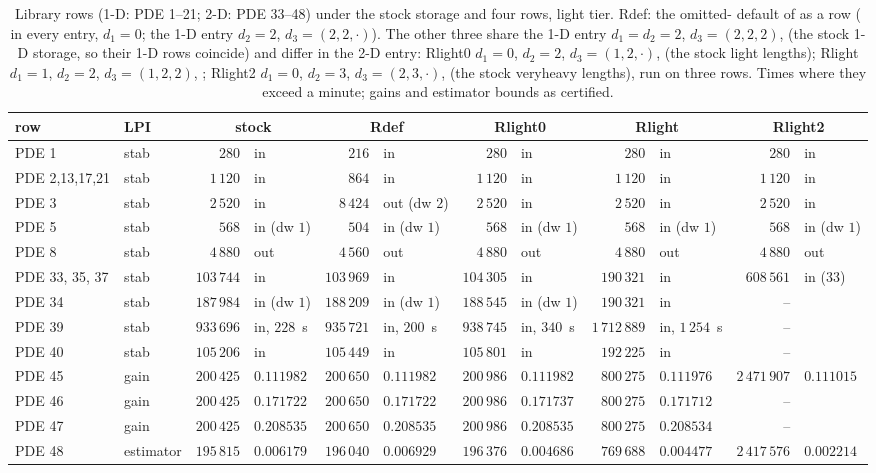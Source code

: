 \begin{table}[h]\centering\scriptsize
\setlength{\tabcolsep}{1.8pt}
\begin{tabular}{llrlrlrlrlrl}
\toprule
row & LPI & \multicolumn{2}{c}{stock} & \multicolumn{2}{c}{Rdef} & \multicolumn{2}{c}{Rlight0} & \multicolumn{2}{c}{Rlight} & \multicolumn{2}{c}{Rlight2} \\
\midrule
PDE 1 & stab & $280$ & in & $216$ & in & $280$ & in & $280$ & in & $280$ & in \\
PDE 2,13,17,21 & stab & $1\,120$ & in & $864$ & in & $1\,120$ & in & $1\,120$ & in & $1\,120$ & in \\
PDE 3 & stab & $2\,520$ & in & $8\,424$ & out (dw $2$) & $2\,520$ & in & $2\,520$ & in & $2\,520$ & in \\
PDE 5 & stab & $568$ & in (dw $1$) & $504$ & in (dw $1$) & $568$ & in (dw $1$) & $568$ & in (dw $1$) & $568$ & in (dw $1$) \\
PDE 8 & stab & $4\,880$ & out & $4\,560$ & out & $4\,880$ & out & $4\,880$ & out & $4\,880$ & out \\
PDE 33, 35, 37 & stab & $103\,744$ & in & $103\,969$ & in & $104\,305$ & in & $190\,321$ & in & $608\,561$ & in (33) \\
PDE 34 & stab & $187\,984$ & in (dw $1$) & $188\,209$ & in (dw $1$) & $188\,545$ & in (dw $1$) & $190\,321$ & in & -- & \\
PDE 39 & stab & $933\,696$ & in, $228$~s & $935\,721$ & in, $200$~s & $938\,745$ & in, $340$~s & $1\,712\,889$ & in, $1\,254$~s & -- & \\
PDE 40 & stab & $105\,206$ & in & $105\,449$ & in & $105\,801$ & in & $192\,225$ & in & -- & \\
PDE 45 & gain & $200\,425$ & $0.111982$ & $200\,650$ & $0.111982$ & $200\,986$ & $0.111982$ & $800\,275$ & $0.111976$ & $2\,471\,907$ & $0.111015$ \\
PDE 46 & gain & $200\,425$ & $0.171722$ & $200\,650$ & $0.171722$ & $200\,986$ & $0.171737$ & $800\,275$ & $0.171712$ & -- & \\
PDE 47 & gain & $200\,425$ & $0.208535$ & $200\,650$ & $0.208535$ & $200\,986$ & $0.208535$ & $800\,275$ & $0.208534$ & -- & \\
PDE 48 & estimator & $195\,815$ & $0.006179$ & $196\,040$ & $0.006929$ & $196\,376$ & $0.004686$ & $769\,688$ & $0.004477$ & $2\,417\,576$ & $0.002214$ \\
\bottomrule
\end{tabular}
\caption{Library rows (1-D: PDE 1--21; 2-D: PDE 33--48) under the stock storage and four rows, light tier. Rdef: the omitted- default of  as a row ( in every entry, $d_1=0$; the 1-D entry $d_2=2$, $d_3=(2,2,\cdot)$). The other three share the 1-D entry $d_1=d_2=2$, $d_3=(2,2,2)$,  (the stock 1-D storage, so their 1-D rows coincide) and differ in the 2-D entry: Rlight0 $d_1=0$, $d_2=2$, $d_3=(1,2,\cdot)$,  (the stock light lengths); Rlight $d_1=1$, $d_2=2$, $d_3=(1,2,2)$, ; Rlight2 $d_1=0$, $d_2=3$, $d_3=(2,3,\cdot)$,  (the stock veryheavy lengths), run on three rows. Times where they exceed a minute; gains and estimator bounds as certified.}\label{tab:bl-lib}
\end{table}

